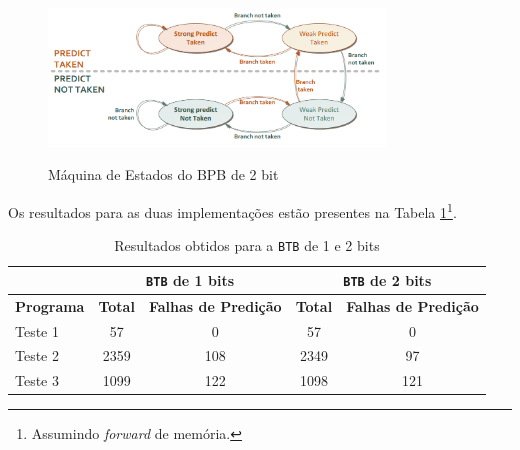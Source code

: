 \begin{figure}[H]
    \centering
    \includegraphics[width=0.8\textwidth]{./btb2bit.png}~\\[1cm]
    \caption{Máquina de Estados do BPB de 2 bit}
    \label{fig:bpb2}
\end{figure}

Os resultados para as duas implementações estão presentes na Tabela \ref{tab:BTB}\footnote{Assumindo \textit{forward} de memória.}.

\begin{table}[H]
  \caption{Resultados obtidos para a \texttt{BTB} de 1 e 2 bits}
  \label{tab:BTB}
  \centering  
  \begin{tabular}{| l | c | c | c | c |}
  	\hline
     & 
    \multicolumn{2}{c|}{\texttt{BTB} de 1 bits} &
    \multicolumn{2}{c|}{\texttt{BTB} de 2 bits} \\ \hline
    \textbf{Programa} & \textbf{Total} & \textbf{Falhas de Predição} & \textbf{Total} & \textbf{Falhas de Predição} \\ \hline
	Teste 1 & 57   & 0   & 57   & 0\\ \hline
    Teste 2 & 2359 & 108 & 2349 & 97\\ \hline
    Teste 3 & 1099 & 122 & 1098 & 121\\
	\hline
  \end{tabular}
\end{table}


